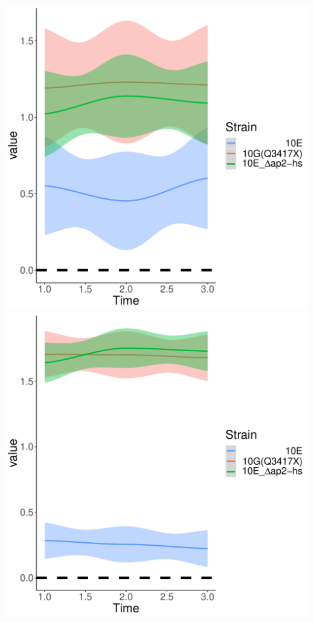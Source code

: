 \documentclass{article}\usepackage[]{graphicx}\usepackage[]{color}
\newenvironment{knitrout}{}{} %
\begin{document}
\begin{knitrout}
{\includegraphics[width=1\linewidth]{figure/minimal-clust_exp-3} 
\includegraphics[width=1\linewidth]{figure/minimal-clust_exp-4} 
}
\end{knitrout}
\end{document}
